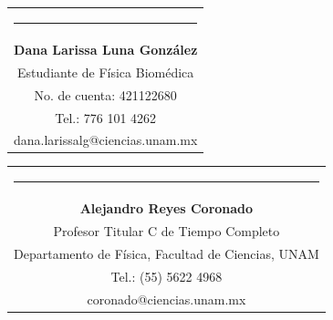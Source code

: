 \documentclass[9pt,letterpaper]{article}
\begin{document}
	\bigskip
	
	{\vspace{2.55cm}\begin{tabular} { c}
			\setlength{\tabcolsep}{15pt}
			\renewcommand{\arraystretch}{1}
			\noindent\rule{5.5cm}{0.4pt}\qquad \\
			
			\qquad  \textbf{Dana Larissa Luna González} \qquad \\
			\qquad Estudiante de Física Biomédica  \qquad \\ \qquad 
			No. de cuenta: 421122680\qquad \\  
			\qquad  Tel.: 776 101 4262 \qquad \\
			\qquad dana.larissalg@ciencias.unam.mx \qquad \\
			
		\end{tabular}
	}
	
	{\vspace{-2.53cm}\hspace{7cm}\begin{tabular} { c}
			\setlength{\tabcolsep}{15pt}
			\renewcommand{\arraystretch}{1}
			\noindent\rule{5.5cm}{0.4pt}\qquad \\
			
			\qquad  \textbf{Alejandro Reyes Coronado} \qquad \\
			\qquad Profesor Titular C de Tiempo Completo  \qquad \\  
			\qquad Departamento de Física, Facultad de Ciencias, UNAM\qquad \\ 
			\qquad  Tel.: (55) 5622 4968 \qquad \\
			\qquad coronado@ciencias.unam.mx \qquad \\
			
		\end{tabular}
		
	}
	
	
	
	
	
	
	
	
	
	
	
	
	
	
	
	
	
	
	
	
	
	
	
	
	
	
	
	\printbibliography
	
\end{document}
